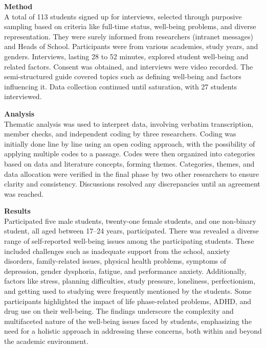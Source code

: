 \vspace{5mm}

\noindent \textbf{Method} \\
A total of 113 students signed up for interviews, selected through purposive sampling based on criteria like full-time status, well-being problems, and diverse representation. They were surely informed from researchers (intranet messages) and Heads of School. Participants were from various academies, study years, and genders. Interviews, lasting 28 to 52 minutes, explored student well-being and related factors. Consent was obtained, and interviews were video recorded. The semi-structured guide covered topics such as defining well-being and factors influencing it. Data collection continued until saturation, with 27 students interviewed.

\vspace{5mm}

\noindent \textbf{Analysis} \\
Thematic analysis was used to interpret data, involving verbatim transcription, member checks, and independent coding by three researchers. Coding was initially done line by line using an open coding approach, with the possibility of applying multiple codes to a passage. Codes were then organized into categories based on data and literature concepts, forming themes. Categories, themes, and data allocation were verified in the final phase by two other researchers to ensure clarity and consistency. Discussions resolved any discrepancies until an agreement was reached.

\vspace{5mm}

\noindent \textbf{Results} \\
Participated five male students, twenty-one female students, and one non-binary student, all aged between 17–24 years, participated. There was revealed a diverse range of self-reported well-being issues among the participating students. These included challenges such as inadequate support from the school, anxiety disorders, family-related issues, physical health problems, symptoms of depression, gender dysphoria, fatigue, and performance anxiety. Additionally, factors like stress, planning difficulties, study pressure, loneliness, perfectionism, and getting used to studying were frequently mentioned by the students. Some participants highlighted the impact of life phase-related problems, ADHD, and drug use on their well-being. The findings underscore the complexity and multifaceted nature of the well-being issues faced by students, emphasizing the need for a holistic approach in addressing these concerns, both within and beyond the academic environment.

